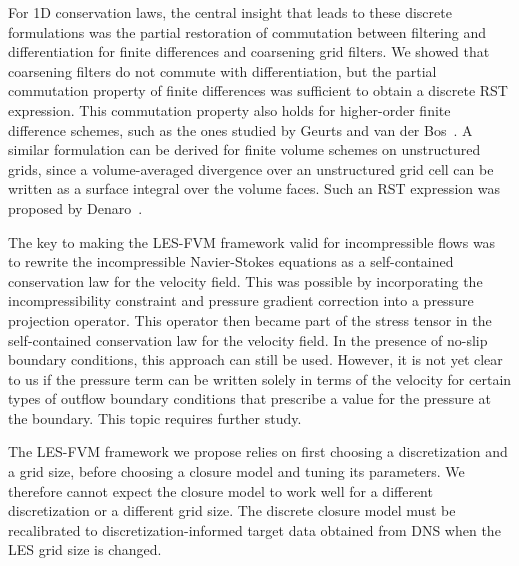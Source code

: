 \documentclass[preprint,twocolumn,5p]{elsarticle}
\begin{document}
For 1D conservation laws,
the central insight that leads to these discrete formulations was the partial
restoration of commutation between filtering and differentiation for finite
differences and coarsening grid filters. We showed that coarsening filters do
not commute with differentiation, but the partial commutation property of
finite differences was sufficient to obtain a discrete RST
expression. This commutation property also holds for higher-order finite
difference schemes, such as the ones studied by Geurts and van der
Bos~\cite{geurtsNumericallyInducedHighpass2005}. A similar formulation can be
derived for finite volume schemes on unstructured grids, since a
volume-averaged divergence over an unstructured grid cell can be written as a
surface integral over the volume faces.
Such an RST expression was proposed
by Denaro~\cite{denaroWhatDoesFinite2011,
denaroInconsistencefreeIntegralbasedDynamic2018}.


The key to making the LES-FVM framework valid for incompressible flows was to
rewrite the incompressible Navier-Stokes equations as a self-contained
conservation law for the velocity field. This was possible by incorporating the
incompressibility constraint and pressure gradient correction into a pressure
projection operator. This operator then became part of the stress tensor in the
self-contained conservation law for the velocity field.
In the presence of no-slip boundary conditions, this approach can still be used.
However, it is not yet clear to us if the pressure term can be written solely
in terms of the velocity for certain types of outflow boundary conditions that
prescribe a value for the pressure at the boundary.
This topic requires further study.



The LES-FVM framework we propose relies on first choosing a discretization
and a grid size, before choosing a closure model and tuning its parameters. We
therefore cannot expect the closure model to work well for a different
discretization or a different grid size. The discrete closure model must be
recalibrated to discretization-informed target data obtained from
DNS when the LES grid size is changed.
\end{document}
